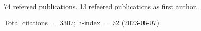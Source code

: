 74 refereed publications. 13 refeered publications as first author.

Total citations~=~3307; h-index~=~32 (2023-06-07)